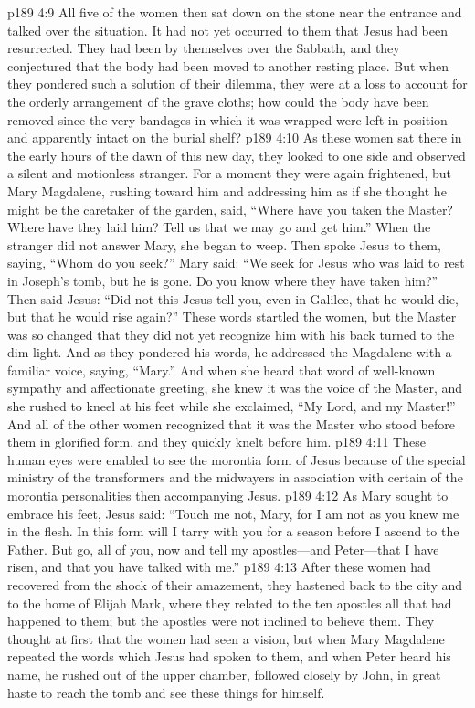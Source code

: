 \vs p189 4:9 All five of the women then sat down on the stone near the entrance and talked over the situation. It had not yet occurred to them that Jesus had been resurrected. They had been by themselves over the Sabbath, and they conjectured that the body had been moved to another resting place. But when they pondered such a solution of their dilemma, they were at a loss to account for the orderly arrangement of the grave cloths; how could the body have been removed since the very bandages in which it was wrapped were left in position and apparently intact on the burial shelf?
\pc \vs p189 4:10 As these women sat there in the early hours of the dawn of this new day, they looked to one side and observed a silent and motionless stranger. For a moment they were again frightened, but Mary Magdalene, rushing toward him and addressing him as if she thought he might be the caretaker of the garden, said, “Where have you taken the Master? Where have they laid him? Tell us that we may go and get him.” When the stranger did not answer Mary, she began to weep. Then spoke Jesus to them, saying, \textcolor{ubdarkred}{“Whom do you seek?”} Mary said: “We seek for Jesus who was laid to rest in Joseph’s tomb, but he is gone. Do you know where they have taken him?” Then said Jesus: \textcolor{ubdarkred}{“Did not this Jesus tell you, even in Galilee, that he would die, but that he would rise again?”} These words startled the women, but the Master was so changed that they did not yet recognize him with his back turned to the dim light. And as they pondered his words, he addressed the Magdalene with a familiar voice, saying, \textcolor{ubdarkred}{“Mary.”} And when she heard that word of well\hyp{}known sympathy and affectionate greeting, she knew it was the voice of the Master, and she rushed to kneel at his feet while she exclaimed, “My Lord, and my Master!” And all of the other women recognized that it was the Master who stood before them in glorified form, and they quickly knelt before him.
\vs p189 4:11 These human eyes were enabled to see the morontia form of Jesus because of the special ministry of the transformers and the midwayers in association with certain of the morontia personalities then accompanying Jesus.
\pc \vs p189 4:12 As Mary sought to embrace his feet, Jesus said: \textcolor{ubdarkred}{“Touch me not, Mary, for I am not as you knew me in the flesh. In this form will I tarry with you for a season before I ascend to the Father. But go, all of you, now and tell my apostles---and Peter---that I have risen, and that you have talked with me.”}
\vs p189 4:13 After these women had recovered from the shock of their amazement, they hastened back to the city and to the home of Elijah Mark, where they related to the ten apostles all that had happened to them; but the apostles were not inclined to believe them. They thought at first that the women had seen a vision, but when Mary Magdalene repeated the words which Jesus had spoken to them, and when Peter heard his name, he rushed out of the upper chamber, followed closely by John, in great haste to reach the tomb and see these things for himself.
